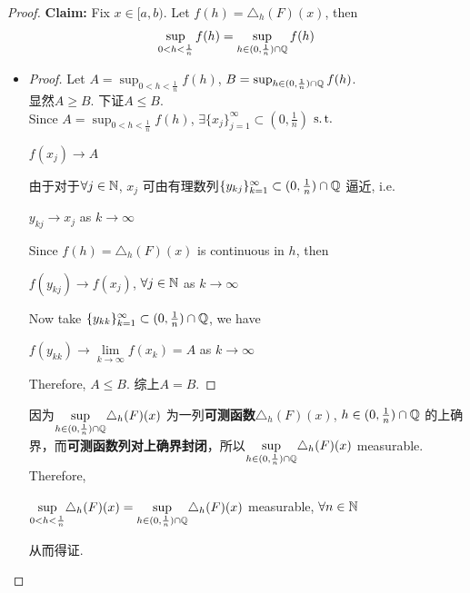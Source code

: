 \begin{lemma}
\begin{proof}
			\vspace{1em}
			
			\textbf{Claim:} Fix $x \in [a , b)$. Let $f(h) = \triangle_{h}(F)(x)$, then
			\begin{align}
				\sup_{0 < h < \frac{1}{n}}{f(h)} = \sup_{h \in (0 , \frac{1}{n}) \cap \mathbb{Q}}{f(h)}
			\end{align}
			
			\vspace{1em}
			\begin{itemize}
				\item 
				\begin{proof}
					Let $A = \sup_{0 < h < \frac{1}{n}}{f(h)}$, $B = \sup_{h \in (0 , \frac{1}{n}) \cap \mathbb{Q}}{f(h)}$. \\
					显然$A \geq B$. 下证$A \leq B$. \\
					Since $A = \sup_{0 < h < \frac{1}{n}}{f(h)}$, $\exists \{ x_j \}_{j = 1}^{\infty} \subset (0 , \frac{1}{n})$ $\operatorname{s.t.}$
					\begin{center}
						$f(x_j) \to A$
					\end{center}
					由于对于$\forall j \in \mathbb{N}$, $x_j$ 可由有理数列$\{ y_{kj} \}_{k = 1}^{\infty} \subset (0 , \frac{1}{n}) \cap \mathbb{Q}$ 逼近, i.e.
					\begin{center}
						$y_{kj} \to x_j$ as $k \to \infty$
					\end{center}
					Since $f(h) = \triangle_{h}(F)(x)$ is continuous in $h$, then
					\begin{center}
						$f(y_{kj}) \to f(x_j)$, $\forall j \in \mathbb{N}$ as $k \to \infty$ 
					\end{center}
					Now take $\{ y_{kk} \}_{k = 1}^{\infty} \subset (0 , \frac{1}{n}) \cap \mathbb{Q}$, we have
					\begin{center}
						$f(y_{kk}) \to \underset{k \to \infty}{\lim}{f(x_k)} = A$ as $k \to \infty$
					\end{center}
					Therefore, $A \leq B$. 综上$A = B$.
				\end{proof}
				
				\vspace{1em}
				因为$\underset{h \in (0 , \frac{1}{n}) \cap \mathbb{Q}}{\sup}{\triangle_{h}(F)(x)}$ 为一列\textbf{可测函数}$\triangle_{h}(F)(x)$, $h \in (0 , \frac{1}{n}) \cap \mathbb{Q}$ 的上确界，而\textbf{可测函数列对上确界封闭}，所以$\underset{h \in (0 , \frac{1}{n}) \cap \mathbb{Q}}{\sup}{\triangle_{h}(F)(x)}$ measurable. \\
				Therefore, 
				\begin{center}
					$\underset{0 < h < \frac{1}{n}}{\sup}{\triangle_{h}(F)(x)} = \underset{h \in (0 , \frac{1}{n}) \cap \mathbb{Q}}{\sup}{\triangle_{h}(F)(x)}$ measurable, $\forall n \in \mathbb{N}$
				\end{center}
				从而得证.
			\end{itemize}
		\end{proof}
	\end{lemma}

